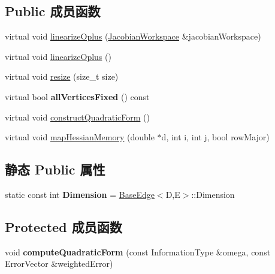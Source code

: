 \subsection*{Public 成员函数}
\begin{DoxyCompactItemize}
\item 
virtual void \hyperlink{classg2o_1_1BaseMultiEdge_a72176776797987b8ae79ea2e33971e9e}{linearize\-Oplus} (\hyperlink{classg2o_1_1JacobianWorkspace}{Jacobian\-Workspace} \&jacobian\-Workspace)
\item 
virtual void \hyperlink{classg2o_1_1BaseMultiEdge_a6196a4cd1ddc2ef27c1474252bb60e9f}{linearize\-Oplus} ()
\item 
virtual void \hyperlink{classg2o_1_1BaseMultiEdge_ae07ec9359cd515d0abc2100ee8aae93f}{resize} (size\-\_\-t size)
\item 
\hypertarget{classg2o_1_1BaseMultiEdge_a0873441402f991c0cfbe92a6ab718daa}{virtual bool {\bfseries all\-Vertices\-Fixed} () const }\label{classg2o_1_1BaseMultiEdge_a0873441402f991c0cfbe92a6ab718daa}

\item 
virtual void \hyperlink{classg2o_1_1BaseMultiEdge_ae44ba0385d4dda4bc038d81e50cadd8c}{construct\-Quadratic\-Form} ()
\item 
virtual void \hyperlink{classg2o_1_1BaseMultiEdge_aecded66022b967fab0deb1c6a2d76445}{map\-Hessian\-Memory} (double $\ast$d, int i, int j, bool row\-Major)
\end{DoxyCompactItemize}
\subsection*{静态 Public 属性}
\begin{DoxyCompactItemize}
\item 
\hypertarget{classg2o_1_1BaseMultiEdge_a3c713fe8d1cd161f777625d8e2d5695d}{static const int {\bfseries Dimension} = \hyperlink{classg2o_1_1BaseEdge}{Base\-Edge}$<$D,E$>$\-::Dimension}\label{classg2o_1_1BaseMultiEdge_a3c713fe8d1cd161f777625d8e2d5695d}

\end{DoxyCompactItemize}
\subsection*{Protected 成员函数}
\begin{DoxyCompactItemize}
\item 
\hypertarget{classg2o_1_1BaseMultiEdge_ac260b65c12f6594165af680f815ac291}{void {\bfseries compute\-Quadratic\-Form} (const Information\-Type \&omega, const Error\-Vector \&weighted\-Error)}\label{classg2o_1_1BaseMultiEdge_ac260b65c12f6594165af680f815ac291}

\end{DoxyCompactItemize}
